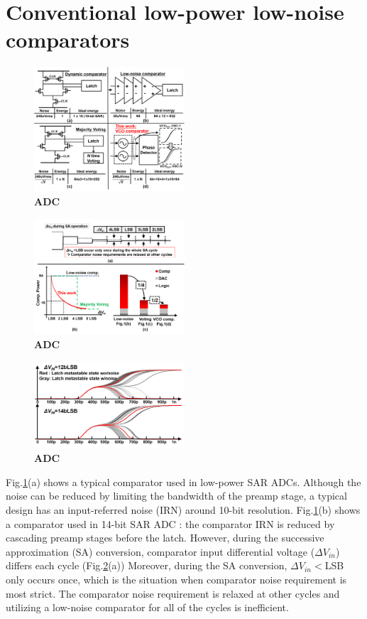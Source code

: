 \documentclass[letterpaper, 10 pt, conference]{ieeeconf}  %
\begin{document}
\section{Conventional low-power low-noise comparators}
\begin{figure}[ht!]
\centering
 \includegraphics[width=0.5\textwidth]{figs/fig1.png}
  \captionsetup{font=footnotesize}
  \caption{\textbf{ADC}}
  \label{fig1}
\end{figure}
\begin{figure}[ht!]
\centering
 \includegraphics[width=0.5\textwidth]{figs/fig2.png}
  \captionsetup{font=footnotesize}
  \caption{\textbf{ADC}}
  \label{fig2}
\end{figure}
\begin{figure}[ht!]
\centering
 \includegraphics[width=0.5\textwidth]{figs/conventional-strongarm.png}
  \captionsetup{font=footnotesize}
  \caption{\textbf{ADC}}
  \label{meta}
\end{figure}

Fig.\ref{fig1}(a) shows a typical comparator used in low-power SAR ADCs\cite{miyahara2008low}. Although the noise can be reduced by limiting the bandwidth of the preamp stage, a typical design has an input-referred noise (IRN) around 10-bit resolution. Fig.\ref{fig1}(b) shows a comparator used in 14-bit SAR ADC \cite{hesener200714b}: the comparator IRN is reduced by cascading preamp stages before the latch. However, during the successive approximation (SA) conversion, comparator input differential voltage ($\Delta V_{in}$) differs each cycle (Fig.\ref{fig2}(a)) Moreover, during the SA conversion, $\Delta V_{in}<$LSB only occurs once, which is the situation when comparator noise requirement is most strict. The comparator noise requirement is relaxed at other cycles and utilizing a low-noise comparator for all of the cycles is inefficient. 
\end{document}
